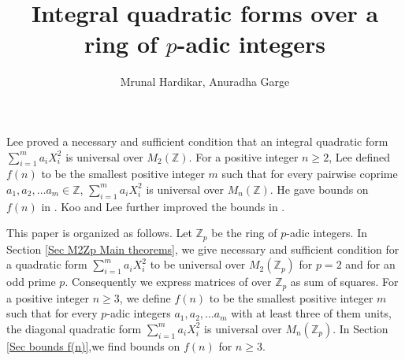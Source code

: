 \documentclass[12pt,a4paper]{article}
\author{Mrunal Hardikar, Anuradha Garge}
\title{Integral quadratic forms over a ring of $p$-adic integers}
\begin{document}
	\maketitle
	Lee \cite{JunginLee} proved a necessary and sufficient condition that an integral quadratic form $\sum_{i=1}^{m} a_iX_i^2$ is universal over $M_2(\mathbb{Z})$. For a positive integer $n \geq 2$, Lee defined $f(n)$ to be the smallest positive integer $m$ such that for every pairwise coprime $a_1, a_2, \ldots a_m \in \mathbb{Z}$, $\sum_{i=1}^{m}a_iX_i^2$ is universal over $M_n(\mathbb{Z})$. He gave bounds on $f(n)$ in \cite{JunginLee}. Koo and Lee further improved the bounds in \cite{Koo2025}.
	
	This paper is organized as follows. Let $\mathbb{Z}_p$ be the ring of $p$-adic integers. In Section \ref{Sec M2Zp Main theorems}, we give necessary and sufficient condition for a quadratic form $\sum_{i=1}^{m}a_iX_i^2$ to be universal over $M_2(\mathbb{Z}_p)$ for $p=2$ and for an odd prime $p$. Consequently we express matrices of over $\mathbb{Z}_p$ as sum of squares. For a positive integer $n \geq 3$, we define $f(n)$ to be the smallest positive integer $m$ such that for every $p$-adic integers $a_1,a_2, \ldots a_m$ with at least three of them units, the diagonal quadratic form $\sum_{i=1}^{m}a_iX_i^2$ is universal over $M_n(\mathbb{Z}_p)$. In Section \ref{Sec bounds f(n)},we find bounds on $f(n)$ for $n \geq 3$. 
	
\end{document}
